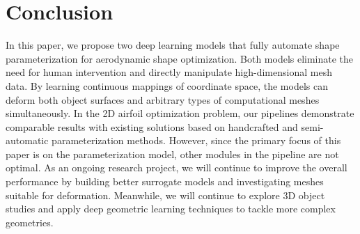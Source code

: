 \section{Conclusion}

In this paper, we propose two deep learning models that fully automate shape parameterization for aerodynamic shape optimization. Both models eliminate the need for human intervention and directly manipulate high-dimensional mesh data. By learning continuous mappings of coordinate space, the models can deform both object surfaces and arbitrary types of computational meshes simultaneously. In the 2D airfoil optimization problem, our pipelines demonstrate comparable results with existing solutions based on handcrafted and semi-automatic parameterization methods. However, since the primary focus of this paper is on the parameterization model, other modules in the pipeline are not optimal. As an ongoing research project, we will continue to improve the overall performance by building better surrogate models and investigating meshes suitable for deformation. Meanwhile, we will continue to explore 3D object studies and apply deep geometric learning techniques to tackle more complex geometries.